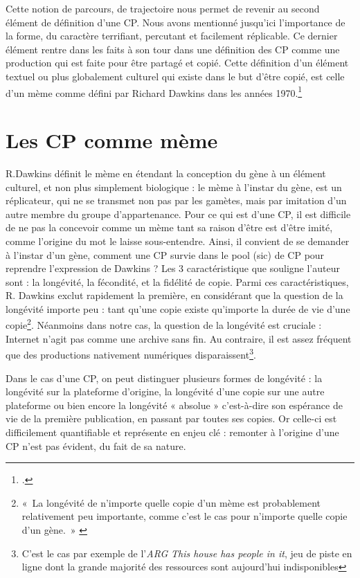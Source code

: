 \documentclass[12pt,a4paper,oneside,titlepage]{book} %
\begin{document}
	Cette notion de parcours, de trajectoire nous permet de revenir au second élément de définition d’une CP. Nous avons mentionné jusqu’ici l’importance de la forme, du caractère terrifiant, percutant et facilement réplicable. Ce dernier élément rentre dans les faits à son tour dans une définition des CP comme une production qui est faite pour être partagé et copié. Cette définition d’un élément textuel ou plus globalement culturel qui existe dans le but d’être copié, est celle d’un mème comme défini par Richard Dawkins dans les années 1970.\footcite{dawkins_selfish_1989}
	
	\section{Les CP comme mème}
	R.Dawkins définit le mème en étendant la conception du gène à un élément culturel, et non plus simplement biologique : le mème à l’instar du gène, est un réplicateur, qui ne se transmet non pas par les gamètes, mais par imitation d’un autre membre du groupe d’appartenance. Pour ce qui est d’une CP, il est difficile de ne pas la concevoir comme un mème tant sa raison d’être est d’être imité, comme l’origine du mot le laisse sous-entendre. 
	Ainsi, il convient de se demander à l’instar d’un gène, comment une CP survie dans le \og pool \fg{}(sic) de CP pour reprendre l’expression de Dawkins ? 
	Les 3 caractéristique que souligne l’auteur sont : la longévité, la fécondité, et la fidélité de copie. Parmi ces caractéristiques, R. Dawkins exclut rapidement la première, en considérant que la question de la longévité importe peu : tant qu’une copie existe qu’importe la durée de vie d’une copie\footnote{« La longévité de n’importe quelle copie d’un mème est probablement relativement peu importante, comme c’est le cas pour n’importe quelle copie d’un gène. » \cite[voir p.218]{dawkins_selfish_1989}}. Néanmoins dans notre cas, la question de la longévité est cruciale : Internet n’agit pas comme une archive sans fin. Au contraire, il est assez fréquent que des productions nativement numériques disparaissent\footnote{C'est le cas par exemple de l'\emph{ARG} \emph{This house has people in it}, jeu de piste en ligne dont la grande majorité des ressources sont aujourd'hui indisponibles}. 
	
	Dans le cas d’une CP, on peut distinguer plusieurs formes de longévité : la longévité sur la plateforme d’origine, la longévité d’une copie sur une autre plateforme ou bien encore la longévité « absolue » c’est-à-dire son espérance de vie de la première publication, en passant par toutes ses copies. Or celle-ci est difficilement quantifiable et représente en enjeu clé : remonter à l’origine d’une CP n’est pas évident, du fait de sa nature.
\end{document}
